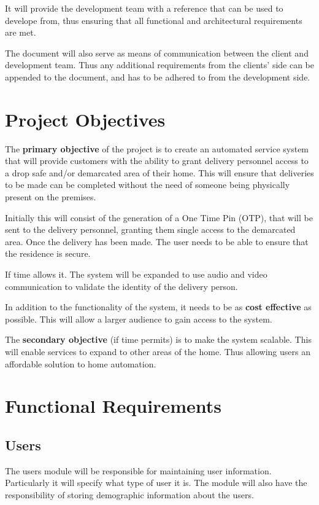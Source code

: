 \documentclass[a4paper,12pt]{article}
\begin{document}
	{\noindent}It will provide the development team with a reference that can be used to develope from, thus ensuring that all functional and architectural requirements are met.
	
	{\noindent}The document will also serve as means of communication between the client and development team. Thus any additional requirements from the clients' side can be appended to the document, and has to be adhered to from the development side.
	
	\section{Project Objectives} The \textbf{primary objective} of the project is to create an automated service system that will provide customers with the ability to grant delivery personnel access to a drop safe and/or demarcated area of their home. This will ensure that deliveries to be made can be completed without the need of someone being physically present on the premises.
	
	{\noindent}Initially this will consist of the generation of a One Time Pin (OTP), that will be sent to the delivery personnel, granting them single access to the demarcated area. Once the delivery has been made. The user needs to be able to ensure that the residence is secure.
	
	{\noindent}If time allows it. The system will be expanded to use audio and video communication to validate the identity of the delivery person.
	
	{\noindent}In addition to the functionality of the system, it needs to be as \textbf{cost effective} as possible. This will allow a larger audience to gain access to the system. 
	
	{\noindent}The \textbf{secondary objective} (if time permits) is to make the system scalable. This will enable services to expand to other areas of the home. Thus allowing users an affordable solution to home automation.
	
	\newpage
	\section{Functional Requirements}
	
	\subsection{Users}
	The users module will be responsible for maintaining user information. Particularly it will specify what type of user it is. The module will also have the responsibility of storing demographic information about the users.
	
\end{document}
